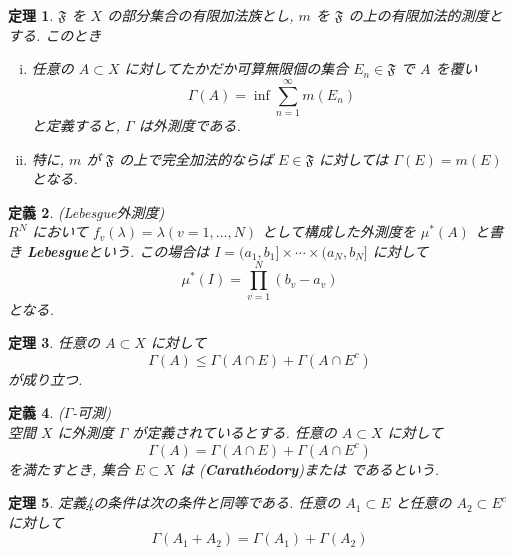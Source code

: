 \documentclass[dvipdfmx]{jsreport}
\newtheorem{theo}{定理}[section]
\newtheorem{defi}[theo]{定義}
\begin{document}
\begin{theo} \label{outer_measure}
    $\mathfrak{F}$ を $X$ の部分集合の有限加法族とし, $m$ を $\mathfrak{F}$ の上の有限加法的測度とする. このとき
    \begin{enumerate}[(i)]
        \item 任意の $A \subset X$ に対してたかだか可算無限個の集合 $E_n \in \mathfrak{F}$ で $A$ を覆い
        \begin{equation}
            \Gamma(A) = \inf \sum_{n = 1}^\infty m(E_n)
        \end{equation}
        と定義すると, $\Gamma$ は外測度である. 
        \item 特に, $m$ が $\mathfrak{F}$ の上で完全加法的ならば $E \in \mathfrak{F}$ に対しては $\Gamma(E) = m(E)$ となる. 
    \end{enumerate}
\end{theo}

\begin{defi}
    (Lebesgue外測度) \\
    $R^N$ において $f_v(\lambda) = \lambda (v = 1, \dots, N)$ として構成した外測度を $\mu^*(A)$ と書き {\bf Lebesgue}という. 
    この場合は $I = (a_1, b_1] \times \cdots \times (a_N, b_N]$ に対して
    \begin{equation}
        \mu^*(I) = \prod_{v = 1}^N (b_v - a_v)
    \end{equation}
    となる. 
\end{defi}

\begin{theo}
    任意の $A \subset X$ に対して
    \begin{equation}
        \Gamma(A) \leq \Gamma(A \cap E) + \Gamma(A \cap E^c)
    \end{equation}
    が成り立つ. 
\end{theo}

\begin{defi} \label{gamma_measurable}
    ($\Gamma$-可測) \\
    空間 $X$ に外測度 $\Gamma$ が定義されているとする. 任意の $A \subset X$ に対して
    \begin{equation}
        \Gamma(A) = \Gamma(A \cap E) + \Gamma(A \cap E^c)
    \end{equation}
    を満たすとき, 集合 $E \subset X$ は ({\bf Carathéodory})または であるという. 
\end{defi}
\begin{theo}
    定義\ref{gamma_measurable}の条件は次の条件と同等である. 任意の $A_1 \subset E$ と任意の $A_2 \subset E^c$ に対して
    \begin{equation}
        \Gamma(A_1 + A_2) = \Gamma(A_1) + \Gamma(A_2)
    \end{equation}
\end{theo}
\end{document}
